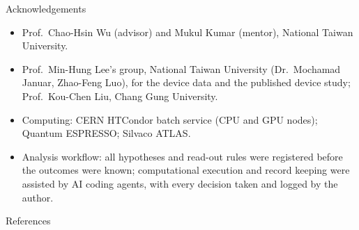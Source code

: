 \begin{frame}{Acknowledgements}
  \begin{itemize}
    \item Prof.\ Chao-Hsin Wu (advisor) and Mukul Kumar (mentor), National Taiwan University.
    \item Prof.\ Min-Hung Lee's group, National Taiwan University (Dr.\ Mochamad Januar, Zhao-Feng Luo), for the
      device data and the published device study; Prof.\ Kou-Chen Liu, Chang Gung University.
    \item Computing: CERN HTCondor batch service (CPU and GPU nodes); Quantum ESPRESSO;
      Silvaco ATLAS.
    \item Analysis workflow: all hypotheses and read-out rules were registered before the outcomes were known;
      computational execution and record keeping were assisted by AI coding agents, with every decision taken and
      logged by the author.
  \end{itemize}
\end{frame}

\begin{frame}[allowframebreaks]{References}
  \printbibliography[heading=none]
\end{frame}
